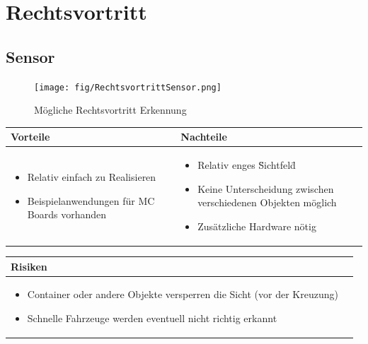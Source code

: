 
\section{Rechtsvortritt}


\subsection{Sensor}

\begin{figure}[h]
	\centering
	\texttt{[image: fig/RechtsvortrittSensor.png]}
	\caption{Mögliche Rechtsvortritt Erkennung}
\end{figure}

\begin{table}[h]
\begin{tabular}{p{} | p{}}


 \textbf{Vorteile} & \textbf{Nachteile} \\ \hline
	 
\begin{itemize}
\item Relativ einfach zu Realisieren
\item Beispielanwendungen für MC Boards vorhanden 
\end{itemize}

 
 &
 
\begin{itemize}
\item Relativ enges \"Sichtfeld\"
\item Keine Unterscheidung zwischen verschiedenen Objekten möglich
\item Zusätzliche Hardware nötig
\end{itemize}

\end{tabular}
\end{table}

\begin{table}[h]
\begin{tabular}{p{}p{}}


 \textbf{Risiken} & \\ \hline
	 
\begin{itemize}
\item Container oder andere Objekte versperren die Sicht (vor der Kreuzung)
\item Schnelle Fahrzeuge werden eventuell nicht richtig erkannt
\end{itemize}


 
\end{tabular}
\end{table}

